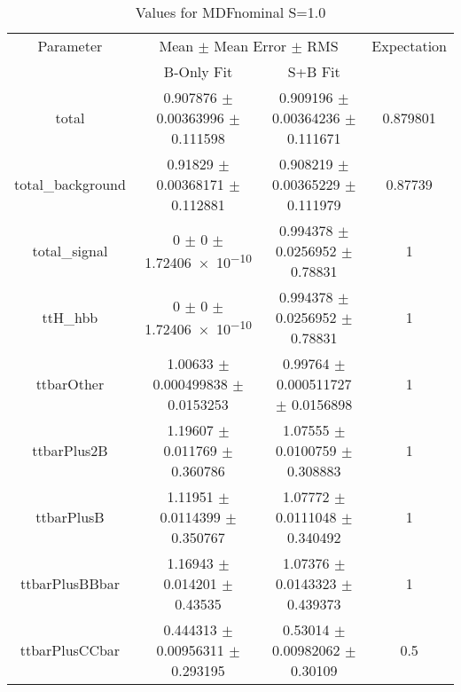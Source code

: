 \begin{table}
\centering
\caption{Values for MDFnominal S=1.0}
\begin{tabular}{cccc}
\toprule
Parameter & \multicolumn{2}{c}{Mean $\pm$ Mean Error $\pm$ RMS} & Expectation\\
 & B-Only Fit & S+B Fit & \\
\midrule
total & \num{0.907876} $\pm$ \num{0.00363996} $\pm$ \num{0.111598} & \num{0.909196} $\pm$ \num{0.00364236} $\pm$ \num{0.111671} & \num{0.879801}\\
total\_background & \num{0.91829} $\pm$ \num{0.00368171} $\pm$ \num{0.112881} & \num{0.908219} $\pm$ \num{0.00365229} $\pm$ \num{0.111979} & \num{0.87739}\\
total\_signal & \num{0} $\pm$ \num{0} $\pm$ \num{1.72406e-10} & \num{0.994378} $\pm$ \num{0.0256952} $\pm$ \num{0.78831} & \num{1}\\
ttH\_hbb & \num{0} $\pm$ \num{0} $\pm$ \num{1.72406e-10} & \num{0.994378} $\pm$ \num{0.0256952} $\pm$ \num{0.78831} & \num{1}\\
ttbarOther & \num{1.00633} $\pm$ \num{0.000499838} $\pm$ \num{0.0153253} & \num{0.99764} $\pm$ \num{0.000511727} $\pm$ \num{0.0156898} & \num{1}\\
ttbarPlus2B & \num{1.19607} $\pm$ \num{0.011769} $\pm$ \num{0.360786} & \num{1.07555} $\pm$ \num{0.0100759} $\pm$ \num{0.308883} & \num{1}\\
ttbarPlusB & \num{1.11951} $\pm$ \num{0.0114399} $\pm$ \num{0.350767} & \num{1.07772} $\pm$ \num{0.0111048} $\pm$ \num{0.340492} & \num{1}\\
ttbarPlusBBbar & \num{1.16943} $\pm$ \num{0.014201} $\pm$ \num{0.43535} & \num{1.07376} $\pm$ \num{0.0143323} $\pm$ \num{0.439373} & \num{1}\\
ttbarPlusCCbar & \num{0.444313} $\pm$ \num{0.00956311} $\pm$ \num{0.293195} & \num{0.53014} $\pm$ \num{0.00982062} $\pm$ \num{0.30109} & \num{0.5}\\
\bottomrule
\end{tabular}
\end{table}